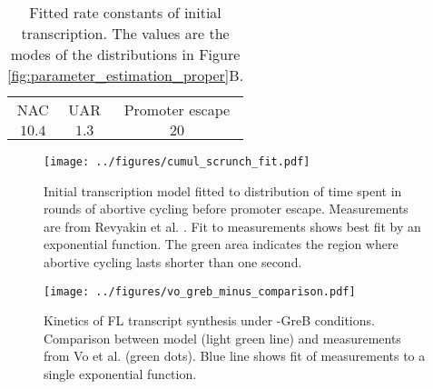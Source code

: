 \begin{table}
  \begin{center}
    \begin{tabular}{ccc}
       \toprule
       NAC & UAR & Promoter escape \\
       $10.4$ & $1.3$ & $20$ \\
    \end{tabular}
  \end{center}
  \caption{Fitted rate constants of initial transcription. The values are the
    modes of the distributions in Figure \ref{fig:parameter_estimation_proper}B.}
  \label{tab:param_fit_revyakin}
\end{table}


\begin{figure}
    \begin{center}
      \texttt{[image: ../figures/cumul\_scrunch\_fit.pdf]}
    \end{center}
    \caption{Initial transcription model fitted to distribution of time spent
      in rounds of abortive cycling before promoter escape. Measurements are
      from Revyakin et al. \cite{revyakin_abortive_2006}. Fit to measurements
      shows best fit by an exponential function. The green area indicates the
      region where abortive cycling lasts shorter than one second.}
\label{fig:revyakin_fit}
\end{figure}


\begin{figure}
    \begin{center}
        \texttt{[image: ../figures/vo\_greb\_minus\_comparison.pdf]}
    \end{center}
    \caption{Kinetics of FL transcript synthesis under -GreB conditions.
      Comparison between model (light green line) and measurements from Vo
      et al. \cite{vo_vitro_2003-1} (green dots). Blue line shows fit of
      measurements to a single exponential function.}
\label{fig:vo_comparison}
\end{figure}

